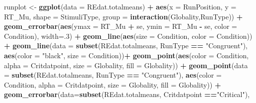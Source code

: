 \documentclass[
]{article}
\newenvironment{Shaded}{\begin{snugshade}}{\end{snugshade}}
\newcommand{\DataTypeTok}[1]{\textcolor[rgb]{0.13,0.29,0.53}{#1}}
\newcommand{\DecValTok}[1]{\textcolor[rgb]{0.00,0.00,0.81}{#1}}
\newcommand{\KeywordTok}[1]{\textcolor[rgb]{0.13,0.29,0.53}{\textbf{#1}}}
\newcommand{\NormalTok}[1]{#1}
\newcommand{\OperatorTok}[1]{\textcolor[rgb]{0.81,0.36,0.00}{\textbf{#1}}}
\newcommand{\StringTok}[1]{\textcolor[rgb]{0.31,0.60,0.02}{#1}}
\begin{document}
\begin{Shaded}
\begin{Highlighting}[]
\NormalTok{runplot <-}\StringTok{ }\KeywordTok{ggplot}\NormalTok{(}\DataTypeTok{data =}\NormalTok{ REdat.totalmeans) }\OperatorTok{+}
\StringTok{  }\KeywordTok{aes}\NormalTok{(}\DataTypeTok{x =}\NormalTok{ RunPosition, }
      \DataTypeTok{y =}\NormalTok{ RT_Mu, }
      \DataTypeTok{shape =}\NormalTok{ StimuliType,}
      \DataTypeTok{group =} \KeywordTok{interaction}\NormalTok{(Globality,RunType)) }\OperatorTok{+}
\StringTok{  }\KeywordTok{geom_errorbar}\NormalTok{(}\KeywordTok{aes}\NormalTok{(}\DataTypeTok{ymax =}\NormalTok{ RT_Mu }\OperatorTok{+}\StringTok{ }\NormalTok{se, }
                    \DataTypeTok{ymin =}\NormalTok{ RT_Mu }\OperatorTok{-}\StringTok{ }\NormalTok{se,}
                    \DataTypeTok{color =}\NormalTok{ Condition), }
                \DataTypeTok{width=}\NormalTok{.}\DecValTok{3}\NormalTok{) }\OperatorTok{+}
\StringTok{  }\KeywordTok{geom_line}\NormalTok{(}\KeywordTok{aes}\NormalTok{(}\DataTypeTok{size =}\NormalTok{ Condition,  }
                \DataTypeTok{color =}\NormalTok{ Condition)) }\OperatorTok{+}
\StringTok{  }\KeywordTok{geom_line}\NormalTok{(}\DataTypeTok{data =} \KeywordTok{subset}\NormalTok{(REdat.totalmeans,}
\NormalTok{                        RunType }\OperatorTok{==}\StringTok{ "Congruent"}\NormalTok{),}
            \KeywordTok{aes}\NormalTok{(}\DataTypeTok{color =} \StringTok{"black"}\NormalTok{,}
                \DataTypeTok{size =}\NormalTok{ Condition))}\OperatorTok{+}
\StringTok{  }\KeywordTok{geom_point}\NormalTok{(}\KeywordTok{aes}\NormalTok{(}\DataTypeTok{color =}\NormalTok{ Condition,}
                 \DataTypeTok{alpha =}\NormalTok{ Critdatpoint,}
                 \DataTypeTok{size =}\NormalTok{ Globality,}
                 \DataTypeTok{fill =}\NormalTok{ Globality)) }\OperatorTok{+}
\StringTok{  }\KeywordTok{geom_point}\NormalTok{(}\DataTypeTok{data =} \KeywordTok{subset}\NormalTok{(REdat.totalmeans,}
\NormalTok{                           RunType }\OperatorTok{==}\StringTok{ "Congruent"}\NormalTok{),}
                           \KeywordTok{aes}\NormalTok{(}\DataTypeTok{color =}\NormalTok{ Condition,}
                               \DataTypeTok{alpha =}\NormalTok{ Critdatpoint,}
                               \DataTypeTok{size =}\NormalTok{ Globality,}
                               \DataTypeTok{fill =}\NormalTok{ Globality)) }\OperatorTok{+}
\StringTok{  }\KeywordTok{geom_errorbar}\NormalTok{(}\DataTypeTok{data=}\KeywordTok{subset}\NormalTok{(REdat.totalmeans, }
\NormalTok{                            Critdatpoint }\OperatorTok{==}\StringTok{"Critical"}\NormalTok{),}

\end{Highlighting}
\end{Shaded}
\end{document}
